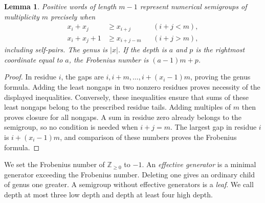 \documentclass[11pt]{amsart}
\newtheorem{lemma}[theorem]{Lemma}
\theoremstyle{definition}
\theoremstyle{remark}
\numberwithin{equation}{section}
\begin{document}
\begin{lemma}\label{cmb:kunz}
Positive words of length $m-1$ represent numerical semigroups of
multiplicity $m$ precisely when
\begin{align}
 x_i+x_j&\ge x_{i+j} &&(i+j<m),\label{cmb:noncarry}\\
 x_i+x_j+1&\ge x_{i+j-m} &&(i+j>m),\label{cmb:carry}
\end{align}
including self-pairs. The genus is $|x|$. If the depth is $a$ and $p$ is the
rightmost coordinate equal to $a$, the Frobenius number is $(a-1)m+p$.
\end{lemma}
\begin{proof}
In residue $i$, the gaps are $i,i+m,\ldots,i+(x_i-1)m$, proving the genus
formula. Adding the least nongaps in two nonzero residues proves necessity
of the displayed inequalities. Conversely, these inequalities ensure that
sums of these least nongaps belong to the prescribed residue tails. Adding
multiples of $m$ then proves closure for all nongaps. A sum in residue zero
already belongs to the semigroup, so no condition is needed when $i+j=m$.
The largest gap in residue $i$ is $i+(x_i-1)m$, and comparison of these
numbers proves the Frobenius formula.
\end{proof}

We set the Frobenius number of $\mathbb Z_{\ge0}$ to $-1$.
An \emph{effective generator} is a minimal generator exceeding the Frobenius
number. Deleting one gives an ordinary child of genus one greater. A
semigroup without effective generators is a \emph{leaf}. We call depth at
most three low depth and depth at least four high depth.
\end{document}
